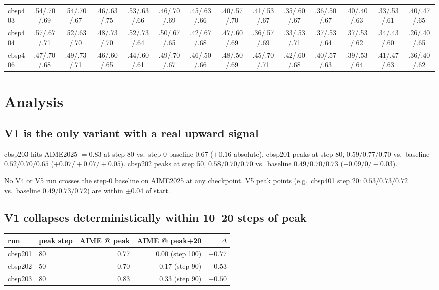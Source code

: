 \documentclass[10pt]{article}
\newcommand{\stable}{\cellcolor{green!20}}
\newcommand{\drift}{\cellcolor{yellow!25}}
\newcommand{\peak}{\cellcolor{blue!15}}
\begin{document}
\begin{center}
\begin{tabular}{l|ccccccccccccc}
cbsp403 & .54/.70/.69 & .54/.70/.67 & .46/.63/\peak .75 & .53/.63/.66 & .46/.70/.69 & .45/.63/.66 & .40/.57/.70 & .41/.53/.67 & .35/.60/.67 & .36/.50/.67 & .40/.40/.63 & .33/.53/.61 & \drift .40/.47/.65 \\
cbsp404 & \peak .57/.67/.71 & .52/.63/.70 & .48/.73/.70 & .52/.73/.64 & .50/.67/.65 & .42/.67/.68 & .47/.60/.69 & .36/.57/.69 & .33/.53/.71 & .37/.53/.64 & .37/.53/.62 & .34/.43/.60 & \drift .26/.40/.65 \\
cbsp406 & .47/.70/.68 & .49/\peak .73/.71 & .46/.60/.65 & .44/.60/.61 & .49/.70/.67 & .46/.50/.66 & .48/.50/.69 & .45/.70/.71 & .42/.60/.68 & .40/.57/.63 & .39/.53/.64 & .41/.47/.63 & \stable .36/.40/.62 \\
\bottomrule
\end{tabular}
\end{center}

\section{Analysis}

\subsection{V1 is the only variant with a real upward signal}

cbsp203 hits AIME2025 $= 0.83$ at step 80 vs.\ step-0 baseline 0.67
($+0.16$ absolute). cbsp201 peaks at step 80, $0.59/0.77/0.70$ vs.\
baseline $0.52/0.70/0.65$ ($+0.07/+0.07/+0.05$). cbsp202 peaks at step
50, $0.58/0.70/0.70$ vs.\ baseline $0.49/0.70/0.73$ ($+0.09/0/-0.03$).

No V4 or V5 run crosses the step-0 baseline on AIME2025 at any
checkpoint. V5 peak points (e.g.\ cbsp401 step 20: $0.53/0.73/0.72$
vs.\ baseline $0.49/0.73/0.72$) are within $\pm 0.04$ of start.

\subsection{V1 collapses deterministically within 10--20 steps of peak}

\begin{center}
\begin{tabular}{llrrr}
\toprule
run     & peak step & AIME @ peak & AIME @ peak+20 & $\Delta$ \\
\midrule
cbsp201 & 80        & 0.77        & 0.00 (step 100) & $-0.77$ \\
cbsp202 & 50        & 0.70        & 0.17 (step 90)  & $-0.53$ \\
cbsp203 & 80        & 0.83        & 0.33 (step 90)  & $-0.50$ \\
\bottomrule
\end{tabular}
\end{center}
\end{document}
